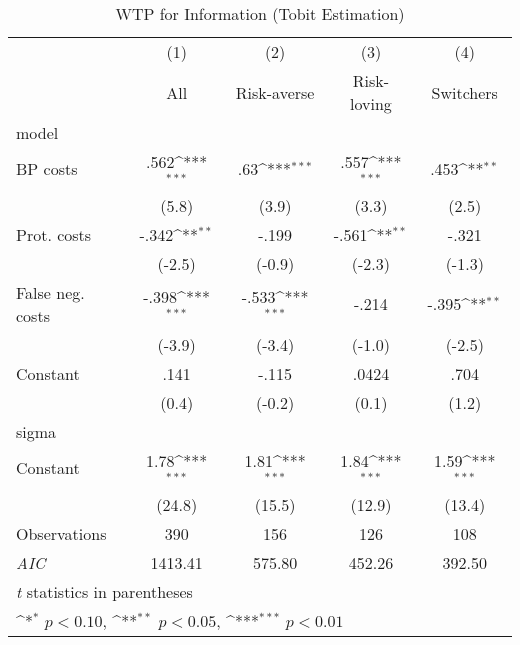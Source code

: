 \begin{table}[htbp]\centering
\def\sym#1{\ifmmode^{#1}\else\(^{#1}\)\fi}
\caption{WTP for Information (Tobit Estimation)}
\begin{tabular}{l*{4}{c}}
\hline\hline
                &\multicolumn{1}{c}{(1)}&\multicolumn{1}{c}{(2)}&\multicolumn{1}{c}{(3)}&\multicolumn{1}{c}{(4)}\\
                &\multicolumn{1}{c}{All}&\multicolumn{1}{c}{Risk-averse}&\multicolumn{1}{c}{Risk-loving}&\multicolumn{1}{c}{Switchers}\\
\hline
model           &                  &                  &                  &                  \\
BP costs        &     .562\sym{***}&      .63\sym{***}&     .557\sym{***}&     .453\sym{**} \\
                &    (5.8)         &    (3.9)         &    (3.3)         &    (2.5)         \\
Prot. costs     &    -.342\sym{**} &    -.199         &    -.561\sym{**} &    -.321         \\
                &   (-2.5)         &   (-0.9)         &   (-2.3)         &   (-1.3)         \\
False neg. costs&    -.398\sym{***}&    -.533\sym{***}&    -.214         &    -.395\sym{**} \\
                &   (-3.9)         &   (-3.4)         &   (-1.0)         &   (-2.5)         \\
Constant        &     .141         &    -.115         &    .0424         &     .704         \\
                &    (0.4)         &   (-0.2)         &    (0.1)         &    (1.2)         \\
\hline
sigma           &                  &                  &                  &                  \\
Constant        &     1.78\sym{***}&     1.81\sym{***}&     1.84\sym{***}&     1.59\sym{***}\\
                &   (24.8)         &   (15.5)         &   (12.9)         &   (13.4)         \\
\hline
Observations    &      390         &      156         &      126         &      108         \\
\textit{AIC}    &  1413.41         &   575.80         &   452.26         &   392.50         \\
\hline\hline
\multicolumn{5}{l}{\footnotesize \textit{t} statistics in parentheses}\\
\multicolumn{5}{l}{\footnotesize \sym{*} \(p<0.10\), \sym{**} \(p<0.05\), \sym{***} \(p<0.01\)}\\
\end{tabular}
\end{table}
